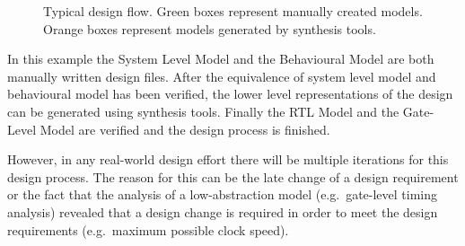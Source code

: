 \begin{figure}[t!]
	\hfil
	\caption{Typical design flow. Green boxes represent manually created models. Orange boxes represent
	models generated by synthesis tools.}
	\label{fig:Basics_flow}
\end{figure}

In this example the System Level Model and the Behavioural Model are both
manually written design files. After the equivalence of system level model
and behavioural model has been verified, the lower level representations of the
design can be generated using synthesis tools. Finally the RTL Model and
the Gate-Level Model are verified and the design process is finished.

However, in any real-world design effort there will be multiple iterations for
this design process. The reason for this can be the late change of a design
requirement or the fact that the analysis of a low-abstraction model (e.g.~gate-level
timing analysis) revealed that a design change is required in order to meet
the design requirements (e.g.~maximum possible clock speed).


